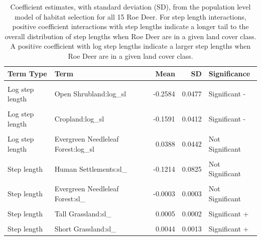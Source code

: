 \documentclass[10pt,a4paper]{article}
\begin{document}
\begingroup\fontsize{9}{11}\selectfont

\begin{longtable}[t]{llrrl}
\caption{\label{tab:poisCoefTableInteractions}Coefficient estimates, with standard deviation (SD), from the population level model of habitat selection for all 15 Roe Deer. For step length interactions, positive coefficient interactions with step lengths indicate a longer tail to the overall distribution of step lengths when Roe Deer are in a given land cover class. A positive coefficient with log step lengths indicate a larger step lengths when Roe Deer are in a given land cover class.}\\
\toprule
Term Type & Term & Mean & SD & Significance\\
\midrule
\cellcolor{gray!10}{Log step length} & \cellcolor{gray!10}{Short Grassland:log\_sl} & \cellcolor{gray!10}{-0.7587} & \cellcolor{gray!10}{0.2221} & \cellcolor{gray!10}{Significant -}\\
Log step length & Open Shrubland:log\_sl & -0.2584 & 0.0477 & Significant -\\
\cellcolor{gray!10}{Log step length} & \cellcolor{gray!10}{Tall Grassland:log\_sl} & \cellcolor{gray!10}{-0.1804} & \cellcolor{gray!10}{0.0328} & \cellcolor{gray!10}{Significant -}\\
Log step length & Cropland:log\_sl & -0.1591 & 0.0412 & Significant -\\
\cellcolor{gray!10}{Log step length} & \cellcolor{gray!10}{Permanent Wetland:log\_sl} & \cellcolor{gray!10}{-0.1568} & \cellcolor{gray!10}{0.1524} & \cellcolor{gray!10}{Not Significant}\\
\addlinespace
Log step length & Evergreen Needleleaf Forest:log\_sl & 0.0388 & 0.0442 & Not Significant\\
\cellcolor{gray!10}{Log step length} & \cellcolor{gray!10}{Human Settlements:log\_sl} & \cellcolor{gray!10}{17.4673} & \cellcolor{gray!10}{13.2464} & \cellcolor{gray!10}{Not Significant}\\
Step length & Human Settlements:sl\_ & -0.1214 & 0.0825 & Not Significant\\
\cellcolor{gray!10}{Step length} & \cellcolor{gray!10}{Permanent Wetland:sl\_} & \cellcolor{gray!10}{-0.0021} & \cellcolor{gray!10}{0.0018} & \cellcolor{gray!10}{Not Significant}\\
Step length & Evergreen Needleleaf Forest:sl\_ & -0.0003 & 0.0003 & Not Significant\\
\addlinespace
\cellcolor{gray!10}{Step length} & \cellcolor{gray!10}{Open Shrubland:sl\_} & \cellcolor{gray!10}{0.0002} & \cellcolor{gray!10}{0.0004} & \cellcolor{gray!10}{Not Significant}\\
Step length & Tall Grassland:sl\_ & 0.0005 & 0.0002 & Significant +\\
\cellcolor{gray!10}{Step length} & \cellcolor{gray!10}{Cropland:sl\_} & \cellcolor{gray!10}{0.0012} & \cellcolor{gray!10}{0.0003} & \cellcolor{gray!10}{Significant +}\\
Step length & Short Grassland:sl\_ & 0.0044 & 0.0013 & Significant +\\
\bottomrule
\end{longtable}
\endgroup{}
\end{document}
